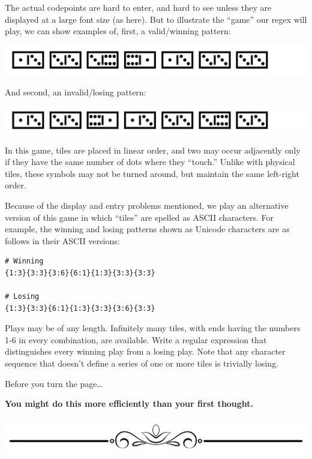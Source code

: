 The actual codepoints are hard to enter, and hard to see unless they are
displayed at a large font size (as here). But to illustrate the ``game''
our regex will play, we can show examples of, first, a valid/winning
pattern:

\includegraphics{images/Dominoes-good.png}

And second, an invalid/losing pattern:

\includegraphics{images/Dominoes-bad.png}

\newpage

In this game, tiles are placed in linear order, and two may occur
adjacently only if they have the same number of dots where they
``touch.'' Unlike with physical tiles, these symbols may not be turned
around, but maintain the same left-right order.

Because of the display and entry problems mentioned, we play an
alternative version of this game in which ``tiles'' are spelled as ASCII
characters. For example, the winning and losing patterns shown as
Unicode characters are as follows in their ASCII versions:

\begin{verbatim}
# Winning
{1:3}{3:3}{3:6}{6:1}{1:3}{3:3}{3:3}

# Losing
{1:3}{3:3}{6:1}{1:3}{3:3}{3:6}{3:3}
\end{verbatim}

Plays may be of any length. Infinitely many tiles, with ends having the
numbers 1-6 in every combination, are available. Write a regular
expression that distinguishes every winning play from a losing play.
Note that any character sequence that doesn't define a series of one or
more tiles is trivially losing.

Before you turn the page\ldots{}

\textbf{You might do this more efficiently than your first thought.}

\includegraphics{images/Elegant-Flourish-Frame-Extrapolated-19.svg}

